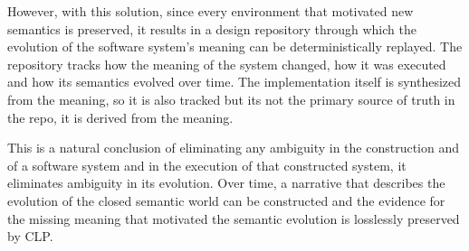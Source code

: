 However, with this solution, since every environment that motivated new semantics is preserved, it results in a design repository through which the evolution of the software system's meaning can be deterministically replayed. The repository tracks how the meaning of the system changed, how it was executed and how its semantics evolved over time. The implementation itself is synthesized from the meaning, so it is also tracked but its not the primary source of truth in the repo, it is derived from the meaning. 

This is a natural conclusion of eliminating any ambiguity in the construction and of a software system and in the execution of that constructed system, it eliminates ambiguity in its evolution. Over time, a narrative that describes the evolution of the closed semantic world can be constructed and the evidence for the missing meaning that motivated the semantic evolution is losslessly preserved by CLP.


